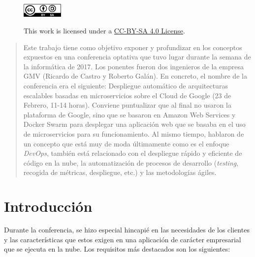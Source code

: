 \begin{titlepage}

\vfill %



\captionsetup[figure]{labelformat=empty,justification=raggedright,singlelinecheck=false}
\begin{figure}[h]

        \includegraphics[width=2cm,keepaspectratio]{cc-by-sa.png}
        \label{fig:by-sa}
        \caption{ This work is licensed under a \href{https://creativecommons.org/licenses/by/4.0/legalcode}{CC-BY-SA 4.0 License}.}

\end{figure}

\end{titlepage}

\tableofcontents
\clearpage

\begin{abstract}
Este trabajo tiene como objetivo exponer y profundizar en los conceptos expuestos en una conferencia optativa que tuvo lugar durante la semana de la informática de 2017. Los ponentes fueron dos ingenieros de la empresa GMV (Ricardo de Castro y Roberto Galán). En concreto, el nombre de la conferencia era el siguiente: Despliegue automático de arquitecturas escalables basadas en microservicios sobre el Cloud de Google (23 de Febrero, 11-14 horas). Conviene puntualizar que al final no usaron la plataforma de Google, sino que se basaron en Amazon Web Services y Docker Swarm para desplegar una aplicación web que se basaba en el uso de microservicios para su funcionamiento. Al mismo tiempo, hablaron de un concepto que está muy de moda últimamente como es el enfoque \emph{DevOps}, también está relacionado con el despliegue rápido y eficiente de código en la nube, la automatización de procesos de desarrollo (\emph{testing}, recogida de métricas, despliegue, etc.) y las metodologías ágiles.
\end{abstract}

\section{Introducción}\label{sec:intro}

Durante la conferencia, se hizo especial hincapié en las necesidades de los clientes y las características que estos exigen en una aplicación de carácter empresarial que se ejecuta en la nube. Los requisitos más destacados son los siguientes:

